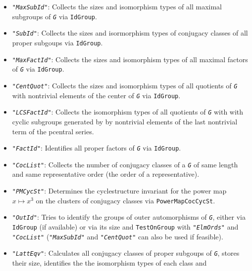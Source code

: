 \documentclass[a4paper,11pt]{report}
\begin{document}
{{{\begin{itemize}
\item  \mbox{\texttt{\mdseries\slshape "MaxSubId"}}: Collects the sizes and isomorphism types of all maximal subgroups of \mbox{\texttt{\mdseries\slshape G}} via \texttt{IdGroup}. 
\item  \mbox{\texttt{\mdseries\slshape "SubId"}}: Collects the sizes and isormorphism types of conjugacy classes of all proper
subgoups via \texttt{IdGroup}. 
\item  \mbox{\texttt{\mdseries\slshape "MaxFactId"}}: Collects the sizes and isomorphism types of all maximal factors of \mbox{\texttt{\mdseries\slshape G}} via \texttt{IdGroup}. 
\item  \mbox{\texttt{\mdseries\slshape "CentQuot"}}: Collects the sizes and isomorphism types of all quotients of \mbox{\texttt{\mdseries\slshape G}} with non\texttt{}trivial elements of the center of \mbox{\texttt{\mdseries\slshape G}} via \texttt{IdGroup}. 
\item  \mbox{\texttt{\mdseries\slshape "LCSFactId"}}: Collects the isomorphism types of all quotients of \mbox{\texttt{\mdseries\slshape G}} with with cyclic subgroups generated by by non\texttt{}trivial
elements of the last non\texttt{}trivial term of the
p\texttt{}central series. 
\item  \mbox{\texttt{\mdseries\slshape "FactId"}}: Identifies all proper factors of \mbox{\texttt{\mdseries\slshape G}} via \texttt{IdGroup}. 
\item  \mbox{\texttt{\mdseries\slshape "CocList"}}: Collects the number of conjugacy classes of a \mbox{\texttt{\mdseries\slshape G}} of same length and same representative order (the order of a representative). 
\item  \mbox{\texttt{\mdseries\slshape "PMCycSt"}}: Determines the cycle\texttt{}structure invariant for the power
map $x\mapsto x^3$ on the clusters of conjugacy classes via \texttt{PowerMapCocCycSt}. 
\item  \mbox{\texttt{\mdseries\slshape "OutId"}}: Tries to identify the groups of outer automorphisms of \mbox{\texttt{\mdseries\slshape G}}, either via \texttt{IdGroup} (if available) or via its size and \texttt{TestOnGroup} with \mbox{\texttt{\mdseries\slshape "ElmOrds"}} and \mbox{\texttt{\mdseries\slshape "CocList"}} (\mbox{\texttt{\mdseries\slshape "MaxSubId"}} and \mbox{\texttt{\mdseries\slshape "CentQuot"}} can also be used if feasible). 
\item  \mbox{\texttt{\mdseries\slshape "LattEqv"}}: Calculates all conjugacy classes of proper subgoups of \mbox{\texttt{\mdseries\slshape G}}, stores their size, identifies the the isomorphism types of each class and

\end{itemize}}}}
\end{document}
